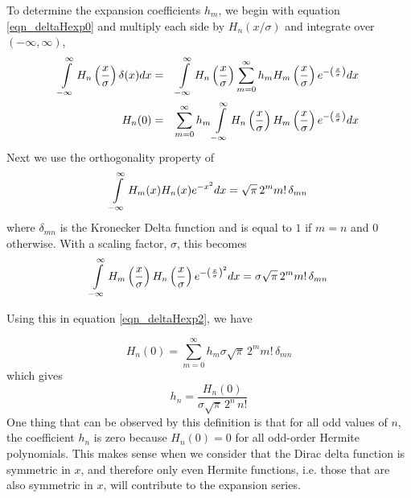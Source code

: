 \documentclass[preprint]{revtex4}
\newcommand{\rtpi}{\ensuremath{\sqrt{\pi}}}
\newcommand{\intl}{\int\displaylimits}
\begin{document}
To determine the expansion coefficients $h_m$, we begin with equation \ref{eqn_deltaHexp0}
and multiply each side by $H_n(x/\sigma)$ and integrate over $(-\infty,\infty)$, 
\begin{eqnarray}
\label{eqn_deltaHexp1}
\intl_{-\infty}^{\infty}H_n\left(\frac{x}{\sigma}\right)\delta(x)dx & = & \intl_{-\infty}^{\infty}H_n\left(\frac{x}{\sigma}\right)\sum_{m=0}^\infty h_m H_m\left(\frac{x}{\sigma}\right) e^{-\left(\frac{x}{\sigma}\right)} dx \\*
H_n(0) & = & 
\sum_{m=0}^\infty h_m \intl_{-\infty}^{\infty}H_n\left(\frac{x}{\sigma}\right)
H_m\left(\frac{x}{\sigma}\right) e^{-\left(\frac{x}{\sigma}\right)} dx 
\label{eqn_deltaHexp2}
\end{eqnarray}
Next we use the orthogonality property\cite{HermiteWiki,HermitePolyMW} of 
\begin{equation}
\label{eqn_Hortho}
\intl_{-\infty}^{\infty}H_m(x)H_n(x)e^{-x^2}dx = \rtpi\, 2^m m!\, \delta_{mn}
\end{equation}
where $\delta_{mn}$ is the Kronecker Delta function and is equal to $1$ if $m=n$ and $0$ otherwise. 
With a scaling factor, $\sigma$, this becomes
\begin{equation}
\label{eqn_Hortho1}
\intl_{-\infty}^{\infty} H_m\left(\frac{x}{\sigma}\right) H_n\left(\frac{x}{\sigma}\right) 
e^{-\left(\frac{x}{\sigma}\right)^2}dx = 
\sigma \rtpi\, 2^m m!\, \delta_{mn}
\end{equation}

Using this in equation \ref{eqn_deltaHexp2}, we have

\begin{equation*}
H_n(0)  =  \sum_{m=0}^\infty h_m \sigma \rtpi\, 2^m m!\, \delta_{mn} \nonumber
\end{equation*}
which gives
\begin{equation}
h_n = \frac{H_n(0)}{\sigma \rtpi \, 2^n \, n!}
\label{eqn_deltaHexp_hn}
\end{equation}
One thing that can be observed by this definition is that for all odd values of $n$, the
coefficient $h_n$ is zero because $H_n(0)=0$ for all odd-order Hermite polynomials. 
This makes sense when we consider that the Dirac delta function is symmetric in $x$, and
therefore only even Hermite functions, i.e. those that are also symmetric in $x$, will
contribute to the expansion series. 
\end{document}
